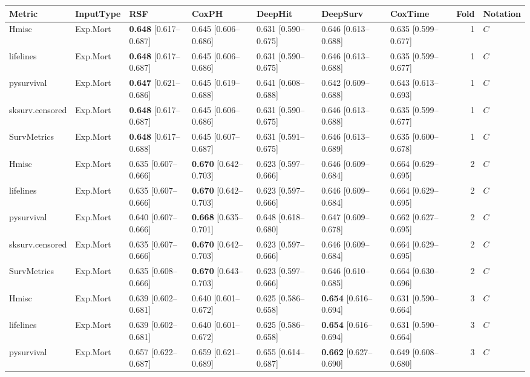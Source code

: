 
\begin{tabular}{lllllllrl}
\toprule
Metric & InputType & RSF & CoxPH & DeepHit & DeepSurv & CoxTime & Fold & Notation\\
\midrule
Hmisc & Exp.Mort & \textbf{0.648} [0.617–0.687] & 0.645 [0.606–0.686] & 0.631 [0.590–0.675] & 0.646 [0.613–0.688] & 0.635 [0.599–0.677] & 1 & $C$\\
lifelines & Exp.Mort & \textbf{0.648} [0.617–0.687] & 0.645 [0.606–0.686] & 0.631 [0.590–0.675] & 0.646 [0.613–0.688] & 0.635 [0.599–0.677] & 1 & $C$\\
pysurvival & Exp.Mort & \textbf{0.647} [0.621–0.686] & 0.645 [0.619–0.688] & 0.641 [0.608–0.688] & 0.642 [0.609–0.688] & 0.643 [0.613–0.693] & 1 & $C$\\
sksurv.censored & Exp.Mort & \textbf{0.648} [0.617–0.687] & 0.645 [0.606–0.686] & 0.631 [0.590–0.675] & 0.646 [0.613–0.688] & 0.635 [0.599–0.677] & 1 & $C$\\
SurvMetrics & Exp.Mort & \textbf{0.648} [0.617–0.688] & 0.645 [0.607–0.687] & 0.631 [0.591–0.675] & 0.646 [0.613–0.689] & 0.635 [0.600–0.678] & 1 & $C$\\
\addlinespace
Hmisc & Exp.Mort & 0.635 [0.607–0.666] & \textbf{0.670} [0.642–0.703] & 0.623 [0.597–0.666] & 0.646 [0.609–0.684] & 0.664 [0.629–0.695] & 2 & $C$\\
lifelines & Exp.Mort & 0.635 [0.607–0.666] & \textbf{0.670} [0.642–0.703] & 0.623 [0.597–0.666] & 0.646 [0.609–0.684] & 0.664 [0.629–0.695] & 2 & $C$\\
pysurvival & Exp.Mort & 0.640 [0.607–0.666] & \textbf{0.668} [0.635–0.701] & 0.648 [0.618–0.680] & 0.647 [0.609–0.678] & 0.662 [0.627–0.695] & 2 & $C$\\
sksurv.censored & Exp.Mort & 0.635 [0.607–0.666] & \textbf{0.670} [0.642–0.703] & 0.623 [0.597–0.666] & 0.646 [0.609–0.684] & 0.664 [0.629–0.695] & 2 & $C$\\
SurvMetrics & Exp.Mort & 0.635 [0.608–0.666] & \textbf{0.670} [0.643–0.703] & 0.623 [0.597–0.666] & 0.646 [0.610–0.685] & 0.664 [0.630–0.696] & 2 & $C$\\
\addlinespace
Hmisc & Exp.Mort & 0.639 [0.602–0.681] & 0.640 [0.601–0.672] & 0.625 [0.586–0.658] & \textbf{0.654} [0.616–0.694] & 0.631 [0.590–0.664] & 3 & $C$\\
lifelines & Exp.Mort & 0.639 [0.602–0.681] & 0.640 [0.601–0.672] & 0.625 [0.586–0.658] & \textbf{0.654} [0.616–0.694] & 0.631 [0.590–0.664] & 3 & $C$\\
pysurvival & Exp.Mort & 0.657 [0.622–0.687] & 0.659 [0.621–0.689] & 0.655 [0.614–0.687] & \textbf{0.662} [0.627–0.690] & 0.649 [0.608–0.680] & 3 & $C$\\

\end{tabular}
